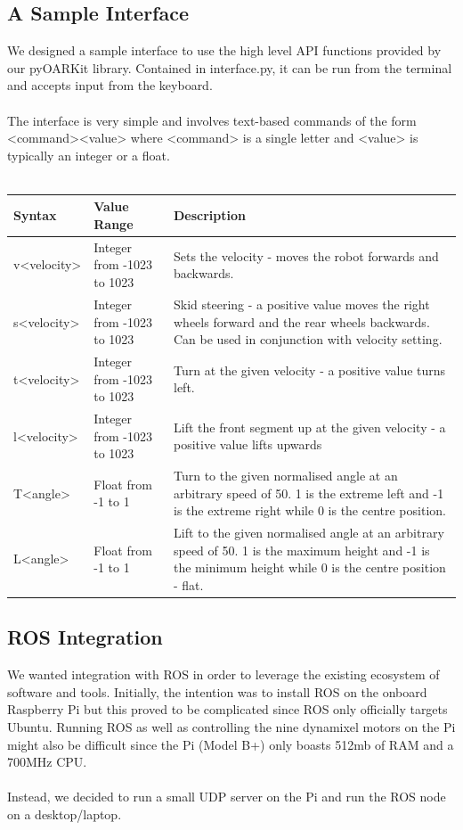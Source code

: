 \documentclass[]{article}
\begin{document}
\subsection{A Sample Interface}
We designed a sample interface to use the high level API functions provided by our pyOARKit library. Contained in interface.py, it can be run from the terminal and accepts input from the keyboard.
\\
\\
The interface is very simple and involves text-based commands of the form <command><value> where <command> is a single letter and <value> is typically an integer or a float.
\\
\\
\begin{tabular}{ | l | l | p{5cm} | }
\hline
\textbf{Syntax} & \textbf{Value Range} & \textbf{Description} \\ \hline
v<velocity> & Integer from -1023 to 1023 & Sets the velocity - moves the robot forwards and backwards. \\ \hline
s<velocity> & Integer from -1023 to 1023 & Skid steering - a positive value moves the right wheels forward and the rear wheels backwards. Can be used in conjunction with velocity setting. \\ \hline
t<velocity> & Integer from -1023 to 1023 & Turn at the given velocity - a positive value turns left. \\ \hline
l<velocity> & Integer from -1023 to 1023 & Lift the front segment up at the given velocity - a positive value lifts upwards \\ \hline
T<angle> & Float from -1 to 1 & Turn to the given normalised angle at an arbitrary speed of 50. 1 is the extreme left and -1 is the extreme right while 0 is the centre position. \\ \hline
L<angle> & Float from -1 to 1 & Lift to the given normalised angle at an arbitrary speed of 50. 1 is the maximum height and -1 is the minimum height while 0 is the centre position - flat. \\ \hline
\end{tabular}

\subsection{ROS Integration}
We wanted integration with ROS in order to leverage the existing ecosystem of software and tools. Initially, the intention was to install ROS on the onboard Raspberry Pi but this proved to be complicated since ROS only officially targets Ubuntu. Running ROS as well as controlling the nine dynamixel motors on the Pi might also be difficult since the Pi (Model B+) only boasts 512mb of RAM and a 700MHz CPU.
\\
\\
Instead, we decided to run a small UDP server on the Pi and run the ROS node on a desktop/laptop.
\end{document}
